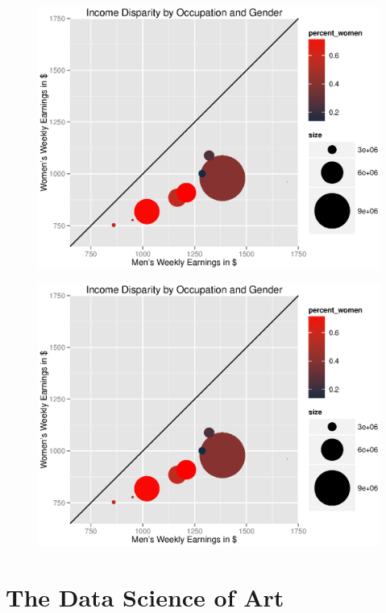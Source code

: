 \documentclass{article}
\begin{document}
\begin{figure}[H]
\begin{center}
\includegraphics[width=1\columnwidth]{gender.eps}
\caption{}
\end{center}
\end{figure}

\begin{figure}[H]
\begin{center}
\includegraphics[width=1\columnwidth]{gender.eps}
\caption{}
\end{center}
\end{figure}

\section{The Data Science of Art}
\end{document}
